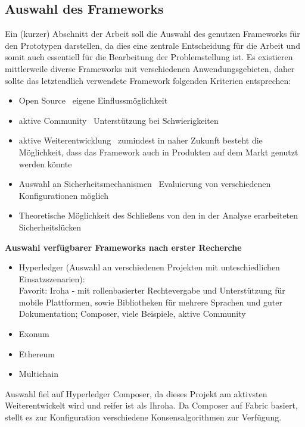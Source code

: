 \subsection{Auswahl des Frameworks}
\label{sec:prototype_framework}
    Ein (kurzer) Abschnitt der Arbeit soll die Auswahl des genutzen Frameworks für den Prototypen darstellen, da dies eine zentrale Entscheidung für die Arbeit und somit auch essentiell für die Bearbeitung der Problemstellung ist.
    Es existieren mittlerweile diverse Frameworks mit verschiedenen Anwendungsgebieten, daher sollte das letztendlich verwendete Framework folgenden Kriterien entsprechen:
    \begin{itemize}
        \item Open Source \textrightarrow\ eigene Einflussmöglichkeit
        \item aktive Community \textrightarrow\ Unterstützung bei Schwierigkeiten
        \item aktive Weiterentwicklung \textrightarrow\ zumindest in naher Zukunft besteht die Möglichkeit, dass das Framework auch in Produkten auf dem Markt genutzt werden könnte
        \item Auswahl an Sicherheitsmechanismen \textrightarrow\ Evaluierung von verschiedenen Konfigurationen möglich
        \item Theoretische Möglichkeit des Schließens von den in der Analyse erarbeiteten Sicherheitslücken
    \end{itemize}
    \medskip
    \textbf{Auswahl verfügbarer Frameworks nach erster Recherche}
    \begin{itemize}
        \item Hyperledger (Auswahl an verschiedenen Projekten mit unteschiedlichen Einsatzszenarien):\\
            Favorit: Iroha - mit rollenbasierter Rechtevergabe und Unterstützung für mobile Plattformen, sowie Bibliotheken für mehrere Sprachen und guter Dokumentation; Composer, viele Beispiele, aktive Community
        \item Exonum
        \item Ethereum
        \item Multichain
    \end{itemize}
    Auswahl fiel auf Hyperledger Composer, da dieses Projekt am aktivsten Weiterentwickelt wird und reifer ist als Ihroha.
    Da Composer auf Fabric basiert, stellt es zur Konfiguration verschiedene Konsensalgorithmen zur Verfügung.
